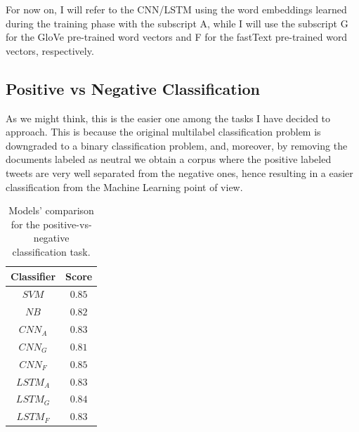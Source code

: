 \documentclass[11pt,twocolumn]{article}
\begin{document}
            \noindent
            For now on, I will refer to the CNN/LSTM using the word embeddings learned during the training
            phase with the subscript A, while I will use the subscript G for the GloVe pre-trained word
            vectors and F for the fastText pre-trained word vectors, respectively.

        \subsection{Positive vs Negative Classification} %
        \label{sub:positive_vs_negative_classification}
            As we might think, this is the easier one among the tasks I have decided to approach. This is
            because the original multilabel classification problem is downgraded to a binary classification
            problem, and, moreover, by removing the documents labeled as neutral we obtain a corpus where
            the positive labeled tweets are very well separated from the negative ones, hence resulting in
            a easier classification from the Machine Learning point of view.

                \begin{table}[h]
                     \centering
                     \begin{tabular}{| c | c |}
                        \hline
                        \textbf{Classifier} & \textbf{Score} \\
                        \hline
                        $SVM$ & $0.85$ \\
                        \hline
                        $NB$ & $0.82$ \\
                        \hline
                        $CNN_A$ & $0.83$ \\
                        \hline
                        $CNN_G$ & $0.81$ \\
                        \hline
                        $CNN_F$ & $0.85$ \\
                        \hline
                        $LSTM_A$ & $0.83$ \\
                        \hline
                        $LSTM_G$ & $0.84$ \\
                        \hline
                        $LSTM_F$ & $0.83$ \\
                        \hline
                    \end{tabular}
                    \caption{Models' comparison for the positive-vs-negative classification task.}
                    \label{tab:pn_comparison}
                \end{table}
\end{document}
